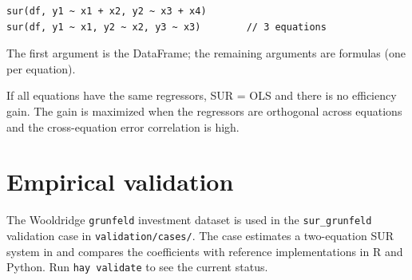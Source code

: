 \begin{lstlisting}
sur(df, y1 ~ x1 + x2, y2 ~ x3 + x4)
sur(df, y1 ~ x1, y2 ~ x2, y3 ~ x3)        // 3 equations
\end{lstlisting}

The first argument is the DataFrame; the remaining arguments are formulas (one per equation).

\begin{nota}
  If all equations have the same regressors, SUR = OLS and there is no
  efficiency gain. The gain is maximized when the regressors are orthogonal
  across equations and the cross-equation error correlation is high.
\end{nota}

\section{Empirical validation}

The Wooldridge \texttt{grunfeld} investment dataset is used in the
\texttt{sur\_grunfeld} validation case in \texttt{validation/cases/}. The case
estimates a two-equation SUR system in \hayashi{} and compares the coefficients
with reference implementations in R and Python. Run \lstinline{hay validate} to
see the current status.
